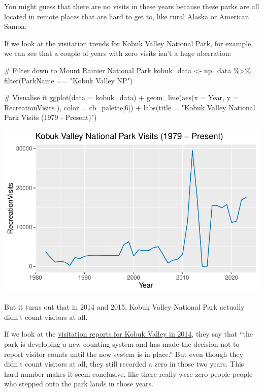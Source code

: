\documentclass[
  letterpaper,
  DIV=11,
  numbers=noendperiod]{scrartcl}
\newenvironment{Shaded}{\begin{snugshade}}{\end{snugshade}}
\newcommand{\AttributeTok}[1]{\textcolor[rgb]{0.40,0.45,0.13}{#1}}
\newcommand{\CommentTok}[1]{\textcolor[rgb]{0.37,0.37,0.37}{#1}}
\newcommand{\DecValTok}[1]{\textcolor[rgb]{0.68,0.00,0.00}{#1}}
\newcommand{\FunctionTok}[1]{\textcolor[rgb]{0.28,0.35,0.67}{#1}}
\newcommand{\NormalTok}[1]{\textcolor[rgb]{0.00,0.23,0.31}{#1}}
\newcommand{\OtherTok}[1]{\textcolor[rgb]{0.00,0.23,0.31}{#1}}
\newcommand{\SpecialCharTok}[1]{\textcolor[rgb]{0.37,0.37,0.37}{#1}}
\newcommand{\StringTok}[1]{\textcolor[rgb]{0.13,0.47,0.30}{#1}}
\begin{document}
You might guess that there are no visits in these years because these
parks are all located in remote places that are hard to get to, like
rural Alaska or American Samoa.

If we look at the visitation trends for Kobuk Valley National Park, for
example, we can see that a couple of years with zero visits isn't a huge
aberration:

\begin{Shaded}
\begin{Highlighting}[]
\CommentTok{\# Filter down to Mount Rainier National Park}
\NormalTok{kobuk\_data }\OtherTok{\textless{}{-}}\NormalTok{ np\_data }\SpecialCharTok{\%\textgreater{}\%} \FunctionTok{filter}\NormalTok{(ParkName }\SpecialCharTok{==} \StringTok{"Kobuk Valley NP"}\NormalTok{)}

\CommentTok{\# Visualise it}
\FunctionTok{ggplot}\NormalTok{(}\AttributeTok{data =}\NormalTok{ kobuk\_data) }\SpecialCharTok{+} 
  \FunctionTok{geom\_line}\NormalTok{(}\FunctionTok{aes}\NormalTok{(}\AttributeTok{x =}\NormalTok{ Year, }\AttributeTok{y =}\NormalTok{ RecreationVisits ), }\AttributeTok{color =}\NormalTok{ cb\_palette[}\DecValTok{6}\NormalTok{]) }\SpecialCharTok{+}
  \FunctionTok{labs}\NormalTok{(}\AttributeTok{title =} \StringTok{"Kobuk Valley National Park Visits (1979 {-} Present)"}\NormalTok{)}
\end{Highlighting}
\end{Shaded}

\includegraphics{data-essay_files/figure-pdf/unnamed-chunk-9-1.pdf}

But it turns out that in 2014 and 2015, Kobuk Valley National Park
actually didn't count visitors at all.

If we look at the
\href{https://irma.nps.gov/Stats/SSRSReports/Park\%20Specific\%20Reports/Monthly\%20Visitation\%20Comments\%20By\%20Park?Park=KOVA}{visitation
reports for Kobuk Valley in 2014}, they say that ``the park is
developing a new counting system and has made the decision not to report
visitor counts until the new system is in place.'' But even though they
didn't count visitors at all, they still recorded a zero in those two
years. This hard number makes it seem conclusive, like there really were
zero people people who stepped onto the park lands in those years.
\end{document}
